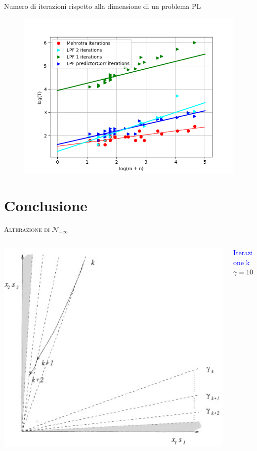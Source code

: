 \begin{frame}
	Numero di iterazioni rispetto alla dimensione di un problema PL
	\begin{figure}
		\includegraphics[width=0.5\paperwidth]{NUM.png}
	\end{figure}

\end{frame}


\section{Conclusione}

\begin{frame}{\textsc{\LARGE \textcolor{iris}{Alterazione di $\mathcal{N}_{-\infty}$}}}
	\begin{columns}
		\begin{column}{0.4\textwidth}
	\includegraphics[scale=0.3]{CONC.PNG}
\end{column}
\begin{column}{0.4\textwidth}
\textcolor{blue}{Iterazione k}\\
$\gamma = 10^{-k}$
\end{column}
\end{columns}
\end{frame}

